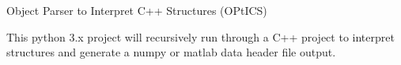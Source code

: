 Object Parser to Interpret C++ Structures (O\+Pt\+I\+CS)

This python 3.\+x project will recursively run through a C++ project to interpret structures and generate a numpy or matlab data header file output. 
